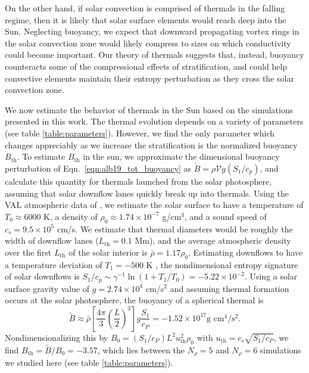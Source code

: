 On the other hand, if solar convection is comprised of thermals in the falling regime, then it is likely that solar surface elements would reach deep into the Sun.
Neglecting buoyancy, we expect that downward propagating vortex rings in the solar convection zone would likely compress to sizes on which conductivity could become important.
Our theory of thermals suggests that, instead, buoyancy counteracts some of the compressional effects of stratification, and could help convective elements maintain their entropy perturbation as they cross the solar convection zone.

We now estimate the behavior of thermals in the Sun based on the simulations presented in this work.
The thermal evolution depends on a variety of parameters (see table \ref{table:parameters}).
However, we find the only parameter which changes appreciably as we increase the stratification is the normalized buoyancy $B_\text{th}$.
To estimate $B_\text{th}$ in the sun, we approximate the dimensional buoyancy perturbation of Eqn.~\ref{eqn:alb19_tot_buoyancy} as $\tilde{B} = \rho \mathcal{V} g (S_1/c_p)$, and calculate this quantity for thermals launched from the solar photosphere, assuming that solar downflow lanes quickly break up into thermals.
Using the VAL atmospheric data of \citet{avrett&loeser2008}, we estimate the solar surface to have a temperature of $T_0 \approx 6000$ K, a density of $\rho_0 \approx 1.74 \times 10^{-7}$ g/cm$^3$, and a sound speed of $c_s = 9.5 \times 10^5$ cm/s.
We estimate that thermal diameters would be roughly the width of downflow lanes ($L_{\text{th}} = 0.1$ Mm), and the average atmospheric density over the first $L_{\text{th}}$ of the solar interior is $\bar{\rho} = 1.17\rho_0$.
Estimating downflows to have a temperature deviation of $T_1 = -500$ K \citep{borrero&bellotrubio2002}, the nondimensional entropy signature of solar downflows is $S_1/c_p \sim \gamma^{-1}\ln(1 + T_1/T_0) = -5.22 \times 10^{-2}$.
Using a solar surface gravity value of $g = 2.74 \times 10^4$ cm/s$^2$ and assuming thermal formation occurs at the solar photosphere, the buoyancy of a spherical thermal is 
$$
\tilde{B} \approx \bar{\rho}\left[\frac{4\pi}{3} \left(\frac{L}{2}\right)^3\right] g \frac{S_1}{c_P} = -1.52 \times 10^{17} \text{g cm}^4/\text{s}^2.
$$
Nondimensionalizing this by $B_0 = (S_1/c_P) L^2 u_{\text{th}}^2 \rho_0$ with $u_{\text{th}} = c_s \sqrt{S_1/c_P}$, we find $B_\text{th} = \tilde{B}/B_0 = -3.57$, which lies between the $N_\rho = 5$ and $N_\rho = 6$ simulations we studied here (see table \ref{table:parameters}).


